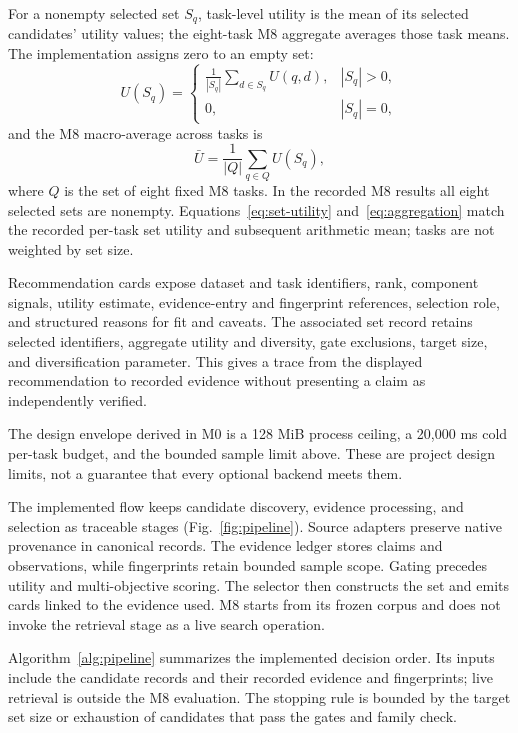 \documentclass[conference]{IEEEtran}
\begin{document}
For a nonempty selected set $S_q$, task-level utility is the mean of its selected candidates' utility values; the eight-task M8 aggregate averages those task means. The implementation assigns zero to an empty set:
\begin{equation}
U(S_q)=
\begin{cases}
\displaystyle\frac{1}{|S_q|}\sum_{d\in S_q}U(q,d), & |S_q|>0,\\
0, & |S_q|=0,
\end{cases}
\label{eq:set-utility}
\end{equation}
and the M8 macro-average across tasks is
\begin{equation}
\bar U=\frac{1}{|Q|}\sum_{q\in Q}U(S_q),
\label{eq:aggregation}
\end{equation}
where $Q$ is the set of eight fixed M8 tasks. In the recorded M8 results all eight selected sets are nonempty. Equations~\ref{eq:set-utility} and~\ref{eq:aggregation} match the recorded per-task set utility and subsequent arithmetic mean; tasks are not weighted by set size.

Recommendation cards expose dataset and task identifiers, rank, component signals, utility estimate, evidence-entry and fingerprint references, selection role, and structured reasons for fit and caveats. The associated set record retains selected identifiers, aggregate utility and diversity, gate exclusions, target size, and diversification parameter. This gives a trace from the displayed recommendation to recorded evidence without presenting a claim as independently verified.

The design envelope derived in M0 is a 128 MiB process ceiling, a 20,000 ms cold per-task budget, and the bounded sample limit above. These are project design limits, not a guarantee that every optional backend meets them.

The implemented flow keeps candidate discovery, evidence processing, and selection as traceable stages (Fig.~\ref{fig:pipeline}). Source adapters preserve native provenance in canonical records. The evidence ledger stores claims and observations, while fingerprints retain bounded sample scope. Gating precedes utility and multi-objective scoring. The selector then constructs the set and emits cards linked to the evidence used. M8 starts from its frozen corpus and does not invoke the retrieval stage as a live search operation.

Algorithm~\ref{alg:pipeline} summarizes the implemented decision order. Its inputs include the candidate records and their recorded evidence and fingerprints; live retrieval is outside the M8 evaluation. The stopping rule is bounded by the target set size or exhaustion of candidates that pass the gates and family check.
\end{document}
